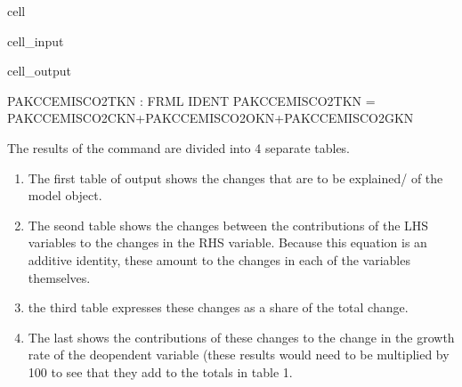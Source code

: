 \documentclass[letterpaper,10pt,english]{jupyterBook}
\begin{document}
\begin{sphinxuseclass}{cell}\begin{sphinxVerbatimInput}

\begin{sphinxuseclass}{cell_input}
\begin{sphinxVerbatim}[commandchars=\\\{\}]
\PYG{p}{[}\PYG{p}{]}
\end{sphinxVerbatim}

\end{sphinxuseclass}\end{sphinxVerbatimInput}
\begin{sphinxVerbatimOutput}

\begin{sphinxuseclass}{cell_output}
\begin{sphinxVerbatim}[commandchars=\\\{\}]
PAKCCEMISCO2TKN : FRML \PYGZlt{}IDENT\PYGZgt{} PAKCCEMISCO2TKN = PAKCCEMISCO2CKN+PAKCCEMISCO2OKN+PAKCCEMISCO2GKN \PYGZdl{}
\end{sphinxVerbatim}

\end{sphinxuseclass}\end{sphinxVerbatimOutput}

\end{sphinxuseclass}
\sphinxAtStartPar
The results of the  command are divided into 4 separate tables.
\begin{enumerate}
%
\item {} 
\sphinxAtStartPar
The first table of output shows the changes that are to be explained/  of the model object.

\item {} 
\sphinxAtStartPar
The seond table shows the changes between the contributions of the LHS variables to the changes in the RHS variable.  Because this equation is an additive identity, these amount to the changes in each of the variables themselves.

\item {} 
\sphinxAtStartPar
the third table expresses these changes as a share of the total change.

\item {} 
\sphinxAtStartPar
The last shows the contributions of these changes to the change in the growth rate of the deopendent variable (these results would need to be multiplied by 100 to see that they add to the totals in table 1.

\end{enumerate}
\end{document}
